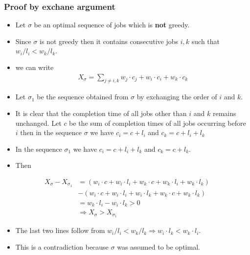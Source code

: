 \documentclass{beamer}
\begin{document}
\begin{frame}
  \frametitle{Proof by exchane argument}
  \begin{itemize}
  \item Let $\sigma$ be an optimal sequence of jobs which is \textbf{ not} greedy.
  \item Since $\sigma$ is not greedy then it contains consecutive jobs $i,k$ such that $w_i/l_i<w_k/l_k$.
   \item we can write 
     \begin{align*}
       X_\sigma=\sum_{j\ne i,k}w_j\cdot c_j+w_i\cdot c_i+w_k\cdot c_k
     \end{align*}
\item Let $\sigma_1$ be the sequence obtained from $\sigma$ by exchanging the order of $i$ and $k$.
\item It is clear that the completion time of all jobs other than $i$ and $k$ remains unchanged. Let $c$ be the sum of completion times of all jobs occurring before $i$ then in the sequence $\sigma$ we have $c_i=c+l_i$ and $c_k=c+l_i+l_k$
  \end{itemize}
\end{frame}
\begin{frame}
  \begin{itemize}
  \item In the sequence $\sigma_1$ we have $c_i=c+l_i+l_k$ and $c_k=c+l_k$.
  \item Then
  \end{itemize}
  \begin{align*}
    X_\sigma-X_{\sigma_1}&=(w_i\cdot c+w_i\cdot l_i+w_k\cdot c+w_k\cdot l_i+w_k\cdot l_k)\\
                      &-(w_i\cdot c+w_i\cdot l_i+w_i\cdot l_k+w_k\cdot c+w_k\cdot l_k)\\
                      &=w_k\cdot l_i-w_i\cdot l_k>0\\
                      &\Rightarrow X_\sigma>X_{\sigma_1}
  \end{align*}
  \begin{itemize}
  \item The last two lines follow from  $w_i/l_i<w_k/l_k\Rightarrow w_i\cdot l_k <w_k\cdot l_i$.
  \item This is a contradiction because $\sigma$ was assumed to be optimal.
  \end{itemize}
\end{frame}
\end{document}
